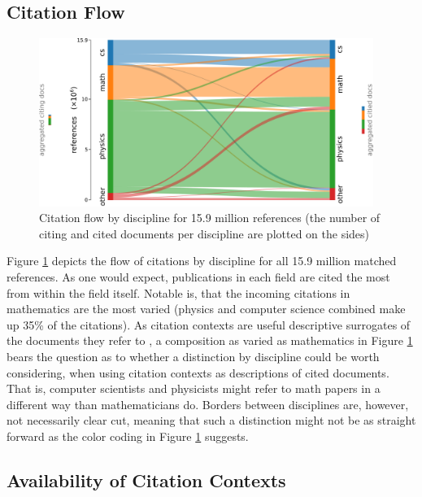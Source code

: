 \subsection{Citation Flow}

\begin{figure}
  \centering
    \includegraphics[width=0.97\textwidth]{figures/corpus/Fig7.pdf}
  \caption[Citation flow by discipline for 15.9 million references]{Citation flow by discipline for 15.9 million references (the number of citing and cited documents per discipline are plotted on the sides)}
  \label{fig:sankey}
\end{figure}

Figure \ref{fig:sankey} depicts the flow of citations by discipline for all 15.9 million matched references. As one would expect, publications in each field are cited the most from within the field itself. Notable is, that the incoming citations in mathematics are the most varied (physics and computer science combined make up 35\% of the citations). As citation contexts are useful descriptive surrogates of the documents they refer to \cite{Elkiss2008fixed}, a composition as varied as mathematics in Figure \ref{fig:sankey} bears the question as to whether a distinction by discipline could be worth considering, when using citation contexts as descriptions of cited documents. That is, computer scientists and physicists might refer to math papers in a different way than mathematicians do. Borders between disciplines are, however, not necessarily clear cut, meaning that such a distinction might not be as straight forward as the color coding in Figure \ref{fig:sankey} suggests.

\subsection{Availability of Citation Contexts}

